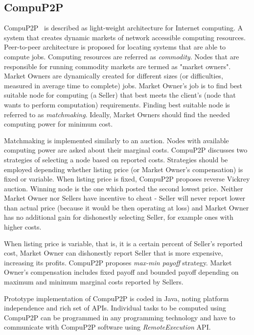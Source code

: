 \begin{comment} 
http://boinc.berkeley.edu/trac/wiki/CompileApp
http://boinc.berkeley.edu/trac/wiki/VboxApps
http://boinc.berkeley.edu/wiki/Client_security_and_sandboxing
\end{comment}

\subsection{CompuP2P}

CompuP2P~\cite{gupta2006compup2p} is described as light-weight architecture for Internet computing. A system that creates dynamic markets of network accessible computing resources. Peer-to-peer architecture is proposed for locating systems that are able to compute jobs. Computing resources are referred as \emph{commodity}. Nodes that are responsible for running commodity markets are termed as "market owners". Market Owners are dynamically created for different sizes (or difficulties, measured in average time to complete) jobs. Market Owner's job is to find best suitable node for computing (a Seller) that best meets the client's (node that wants to perform computation) requirements. Finding best suitable node is referred to as \emph{matchmaking}. Ideally, Market Owners should find the needed computing power for minimum cost.

Matchmaking is implemented similarly to an auction. Nodes with available computing power are asked about their marginal costs. CompuP2P discusses two strategies of selecting a node based on reported costs. Strategies should be employed depending whether listing price (or Market Owner's compensation) is fixed or variable. When listing price is fixed, CompuP2P proposes reverse Vickrey auction. Winning node is the one which posted the second lowest price. Neither Market Owner nor Sellers have incentive to cheat - Seller will never report lower than actual price (because it would be then operating at loss) and Market Owner has no additional gain for dishonestly selecting Seller, for example ones with higher costs.

When listing price is variable, that is, it is a certain percent of Seller's reported cost, Market Owner can dishonestly report Seller that is more expensive, increasing its profits. CompuP2P proposes \emph{max-min payoff} strategy. Market Owner's compensation includes fixed payoff and bounded payoff depending on maximum and minimum marginal costs reported by Sellers.

Prototype implementation of CompuP2P is coded in Java, noting platform independence and rich set of APIs. Individual tasks to be computed using CompuP2P can be programmed in any programming technology and have to communicate with CompuP2P software using \emph{RemoteExecution} API.

